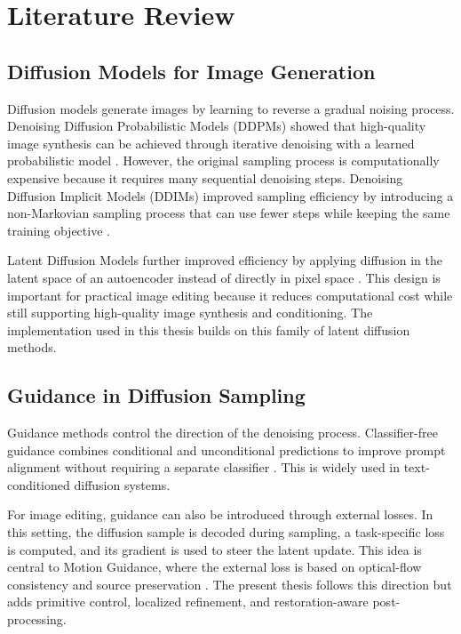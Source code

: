 \setlength{\footskip}{8mm}

\chapter{Literature Review}
\label{ch:literature-review}

\section{Diffusion Models for Image Generation}

Diffusion models generate images by learning to reverse a gradual noising process. Denoising Diffusion Probabilistic Models (DDPMs) showed that high-quality image synthesis can be achieved through iterative denoising with a learned probabilistic model \cite{ho2020ddpm}. However, the original sampling process is computationally expensive because it requires many sequential denoising steps. Denoising Diffusion Implicit Models (DDIMs) improved sampling efficiency by introducing a non-Markovian sampling process that can use fewer steps while keeping the same training objective \cite{song2021ddim}.

Latent Diffusion Models further improved efficiency by applying diffusion in the latent space of an autoencoder instead of directly in pixel space \cite{rombach2022ldm}. This design is important for practical image editing because it reduces computational cost while still supporting high-quality image synthesis and conditioning. The implementation used in this thesis builds on this family of latent diffusion methods.

\section{Guidance in Diffusion Sampling}

Guidance methods control the direction of the denoising process. Classifier-free guidance combines conditional and unconditional predictions to improve prompt alignment without requiring a separate classifier \cite{ho2022classifierfree}. This is widely used in text-conditioned diffusion systems.

For image editing, guidance can also be introduced through external losses. In this setting, the diffusion sample is decoded during sampling, a task-specific loss is computed, and its gradient is used to steer the latent update. This idea is central to Motion Guidance, where the external loss is based on optical-flow consistency and source preservation \cite{geng2024motionguidance}. The present thesis follows this direction but adds primitive control, localized refinement, and restoration-aware post-processing.

